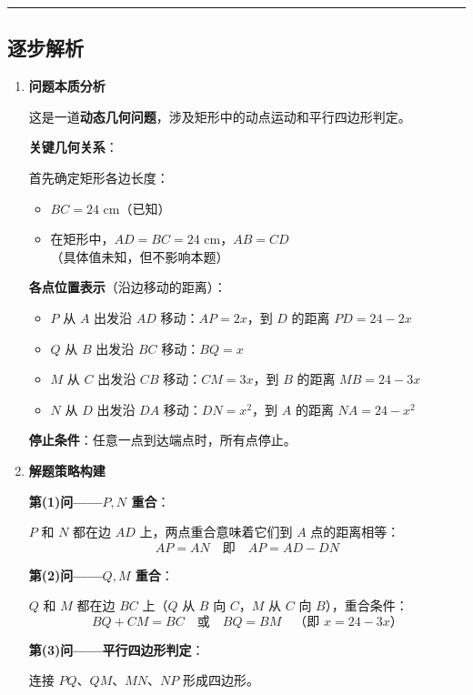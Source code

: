 \documentclass[UTF8]{ctexart}
\newenvironment{redenv}{\color{red}}{}
\newenvironment{detailedanalysis}{%
    \color{red}
    \begin{enumerate}[label=\textbf{第\arabic*步：}, leftmargin=*, align=left, itemsep=1.5ex]
}{%
    \end{enumerate}
}
\newenvironment{conceptbox}{%
    \begin{tcolorbox}[colback=red!5, colframe=red!50!black, title=概念解析, fonttitle=\bfseries]
}{%
    \end{tcolorbox}
}
\newcommand{\analysisrule}{\noindent\rule{\textwidth}{0.8pt}\vspace{-0.8em}}
\begin{document}
\begin{redenv}
\analysisrule
\subsection*{逐步解析}

\begin{detailedanalysis}
\item \textbf{问题本质分析}

这是一道\textbf{动态几何问题}，涉及矩形中的动点运动和平行四边形判定。

\begin{conceptbox}
\textbf{关键几何关系}：

首先确定矩形各边长度：
\begin{itemize}
    \item $BC = 24$ cm（已知）
    \item 在矩形中，$AD = BC = 24$ cm，$AB = CD$（具体值未知，但不影响本题）
\end{itemize}

\textbf{各点位置表示}（沿边移动的距离）：
\begin{itemize}
    \item $P$ 从 $A$ 出发沿 $AD$ 移动：$AP = 2x$，到 $D$ 的距离 $PD = 24 - 2x$
    \item $Q$ 从 $B$ 出发沿 $BC$ 移动：$BQ = x$
    \item $M$ 从 $C$ 出发沿 $CB$ 移动：$CM = 3x$，到 $B$ 的距离 $MB = 24 - 3x$
    \item $N$ 从 $D$ 出发沿 $DA$ 移动：$DN = x^2$，到 $A$ 的距离 $NA = 24 - x^2$
\end{itemize}

\textbf{停止条件}：任意一点到达端点时，所有点停止。
\end{conceptbox}

\item \textbf{解题策略构建}

\noindent\textbf{第(1)问——$P, N$ 重合}：

$P$ 和 $N$ 都在边 $AD$ 上，两点重合意味着它们到 $A$ 点的距离相等：
\[
AP = AN \quad \text{即} \quad AP = AD - DN
\]

\noindent\textbf{第(2)问——$Q, M$ 重合}：

$Q$ 和 $M$ 都在边 $BC$ 上（$Q$ 从 $B$ 向 $C$，$M$ 从 $C$ 向 $B$），重合条件：
\[
BQ + CM = BC \quad \text{或} \quad BQ = BM \quad \text{（即 $x = 24 - 3x$）}
\]

\noindent\textbf{第(3)问——平行四边形判定}：

连接 $PQ$、$QM$、$MN$、$NP$ 形成四边形。


\end{detailedanalysis}
\end{redenv}
\end{document}
